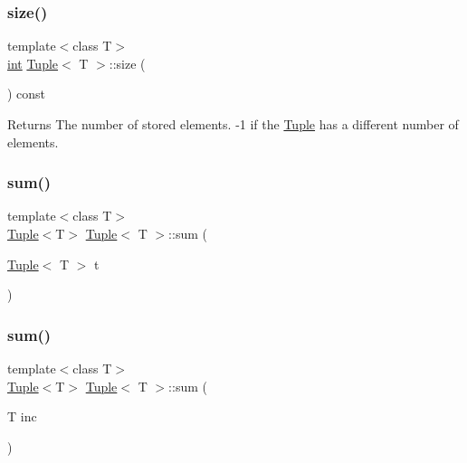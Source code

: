 \subsubsection{\texorpdfstring{size()}{size()}}
{\footnotesize\ttfamily template$<$class T$>$ \\
\mbox{\hyperlink{draw_8hh_aa620a13339ac3a1177c86edc549fda9b}{int}} \mbox{\hyperlink{class_tuple}{Tuple}}$<$ T $>$\+::size (\begin{DoxyParamCaption}{ }\end{DoxyParamCaption}) const\hspace{0.3cm}{\ttfamily [inline]}}

\begin{DoxyReturn}{Returns}
The number of stored elements. -\/1 if the \mbox{\hyperlink{class_tuple}{Tuple}} has a different number of elements. 
\end{DoxyReturn}
\mbox{\label{class_tuple_a2b595ce33576c6fcb36d74b46f0a7c55}} 
\subsubsection{\texorpdfstring{sum()}{sum()}\hspace{0.1cm}{\footnotesize\ttfamily [1/2]}}
{\footnotesize\ttfamily template$<$class T$>$ \\
\mbox{\hyperlink{class_tuple}{Tuple}}$<$T$>$ \mbox{\hyperlink{class_tuple}{Tuple}}$<$ T $>$\+::sum (\begin{DoxyParamCaption}\item[{\mbox{\hyperlink{class_tuple}{Tuple}}$<$ T $>$}]{t }\end{DoxyParamCaption})\hspace{0.3cm}{\ttfamily [inline]}}

\mbox{\label{class_tuple_a20daa0804e2bac28949b5abe0cbcc589}} 
\subsubsection{\texorpdfstring{sum()}{sum()}\hspace{0.1cm}{\footnotesize\ttfamily [2/2]}}
{\footnotesize\ttfamily template$<$class T$>$ \\
\mbox{\hyperlink{class_tuple}{Tuple}}$<$T$>$ \mbox{\hyperlink{class_tuple}{Tuple}}$<$ T $>$\+::sum (\begin{DoxyParamCaption}\item[{T}]{inc }\end{DoxyParamCaption})\hspace{0.3cm}{\ttfamily [inline]}}



